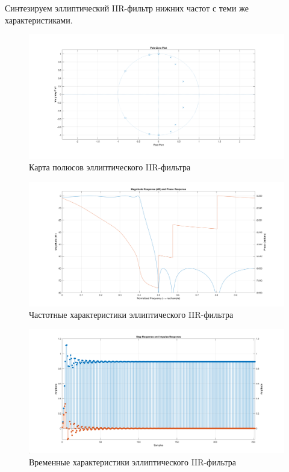 \documentclass[12pt,a4paper]{article}
\begin{document}
	Синтезируем эллиптический IIR-фильтр нижних частот с теми же характеристиками.
		
	\begin{figure}[H]
		\centering
		\includegraphics[width=1.0\linewidth]{res/5_ellp_poles.png}
		\caption{Карта полюсов эллиптического IIR-фильтра}
	\end{figure}
	
	\begin{figure}[H]
		\centering
		\includegraphics[width=1.0\linewidth]{res/5_ellp_ach.png}
		\caption{Частотные характеристики эллиптического IIR-фильтра}
	\end{figure}
	
	\begin{figure}[H]
		\centering
		\includegraphics[width=1.0\linewidth]{res/5_ellp_time.png}
		\caption{Временные характеристики эллиптического IIR-фильтра}
	\end{figure}
	
\end{document}
